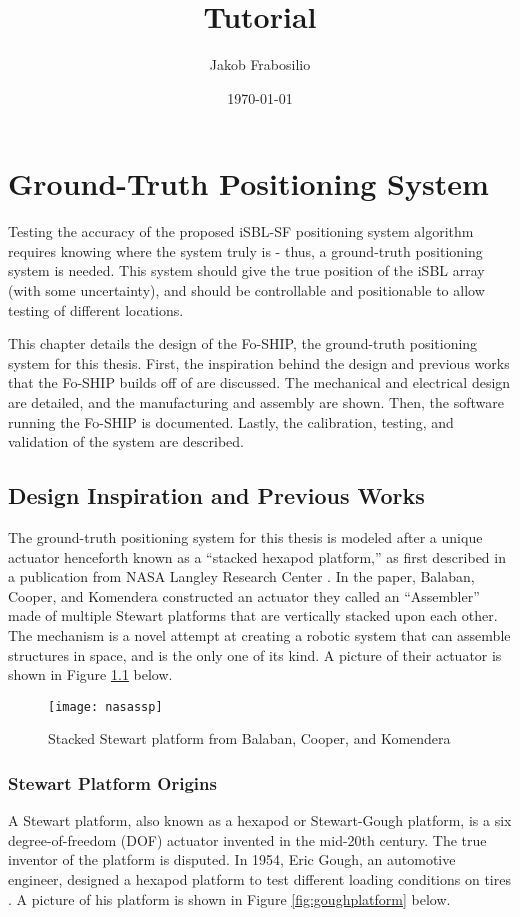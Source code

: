\documentclass[12pt,a4paper]{report}
\title{Tutorial}
\author{Jakob Frabosilio}
\date{\today}
\begin{document}
	
\chapter{Ground-Truth Positioning System} \label{chap:2c}
Testing the accuracy of the proposed iSBL-SF positioning system algorithm requires knowing where the system truly is - thus, a ground-truth positioning system is needed. This system should give the true position of the iSBL array (with some uncertainty), and should be controllable and positionable to allow testing of different locations. 

This chapter details the design of the Fo-SHIP, the ground-truth positioning system for this thesis. First, the inspiration behind the design and previous works that the Fo-SHIP builds off of are discussed. The mechanical and electrical design are detailed, and the manufacturing and assembly are shown. Then, the software running the Fo-SHIP is documented. Lastly, the calibration, testing, and validation of the system are described.

\section{Design Inspiration and Previous Works} \label{sec:2s1}
The ground-truth positioning system for this thesis is modeled after a unique actuator henceforth known as a “stacked hexapod platform,” as first described in a publication from NASA Langley Research Center \cite{nasaSSPpaper}. In the paper, Balaban, Cooper, and Komendera constructed an actuator they called an “Assembler” made of multiple Stewart platforms that are vertically stacked upon each other. The mechanism is a novel attempt at creating a robotic system that can assemble structures in space, and is the only one of its kind. A picture of their actuator is shown in Figure \ref{fig:nasassp} below.

\begin{figure}[htbp]
	\centering
	\texttt{[image: nasassp]}
	\caption{Stacked Stewart platform from Balaban, Cooper, and Komendera \cite{nasaSSPpaper}}
	\label{fig:nasassp}
\end{figure}

\subsection{Stewart Platform Origins} \label{ssec:2s1s1}
A Stewart platform, also known as a hexapod or Stewart-Gough platform, is a six degree-of-freedom (DOF) actuator invented in the mid-20th century. The true inventor of the platform is disputed. In 1954, Eric Gough, an automotive engineer, designed a hexapod platform to test different loading conditions on tires \cite{parallelorigins}. A picture of his platform is shown in Figure \ref{fig:goughplatform} below.
\end{document}
